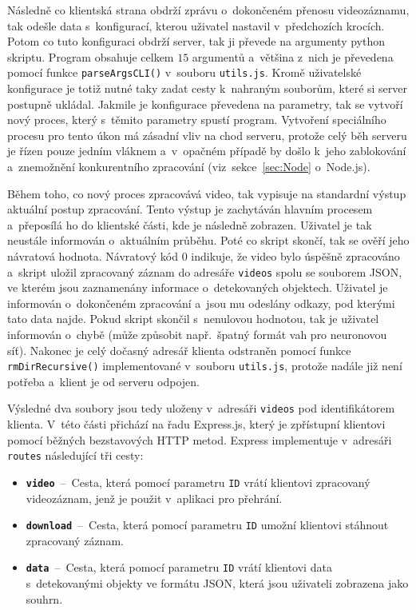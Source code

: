 Následně co klientská strana obdrží zprávu o~dokončeném přenosu videozáznamu, tak odešle data s~konfigurací, kterou uživatel nastavil v~předchozích krocích. Potom co tuto konfiguraci obdrží server, tak ji převede na argumenty python skriptu. Program obsahuje celkem $15$ argumentů a~většina z~nich je převedena pomocí funkce \texttt{parseArgsCLI()} v~souboru \texttt{utils.js}. Kromě uživatelské konfigurace je totiž nutné taky zadat cesty k~nahraným souborům, které si server postupně ukládal. Jakmile je konfigurace převedena na parametry, tak se vytvoří nový proces, který s~těmito parametry spustí program. Vytvoření speciálního procesu pro tento úkon má zásadní vliv na chod serveru, protože celý běh serveru je řízen pouze jedním vláknem a~v~opačném případě by došlo k~jeho zablokování a~znemožnění konkurentního zpracování (viz~sekce~\ref{sec:Node} o~Node.js).

Během toho, co nový proces zpracovává video, tak vypisuje na standardní výstup aktuální postup zpracování. Tento výstup je zachytáván hlavním procesem a~přeposílá ho do klientské části, kde je následně zobrazen. Uživatel je tak neustále informován o~aktuálním průběhu. Poté co skript skončí, tak se ověří jeho návratová hodnota. Návratový kód $0$ indikuje, že video bylo úspěšně zpracováno a~skript uložil zpracovaný záznam do adresáře \texttt{videos} spolu se souborem JSON, ve kterém jsou zaznamenány informace o~detekovaných objektech. Uživatel je informován o~dokončeném zpracování a~jsou mu odeslány odkazy, pod kterými tato data najde. Pokud skript skončil s~nenulovou hodnotou, tak je uživatel informován o~chybě (může způsobit např.~špatný formát vah pro neuronovou síť). Nakonec je celý dočasný adresář klienta odstraněn pomocí funkce \texttt{rmDirRecursive()} implementované v~souboru \texttt{utils.js}, protože nadále již není potřeba a~klient je od serveru odpojen.

Výsledné dva soubory jsou tedy uloženy v~adresáři \texttt{videos} pod identifikátorem klienta. V~této části přichází na řadu Express.js, který je zpřístupní klientovi pomocí běžných bezstavových HTTP metod. Express implementuje v~adresáři \texttt{routes} následující tři cesty:
\begin{itemize}
    \item \texttt{\textbf{video}}~--~Cesta, která pomocí parametru \texttt{ID} vrátí klientovi zpracovaný videozáznam, jenž je použit v~aplikaci pro přehrání.
    \item \texttt{\textbf{download}}~--~Cesta, která pomocí parametru \texttt{ID} umožní klientovi stáhnout zpracovaný záznam.
    \item \texttt{\textbf{data}}~--~Cesta, která pomocí parametru \texttt{ID} vrátí klientovi data s~detekovanými objekty ve formátu JSON, která jsou uživateli zobrazena jako souhrn.
\end{itemize}


